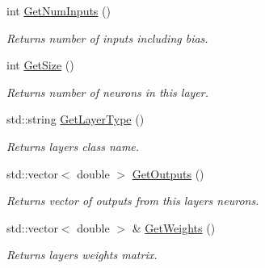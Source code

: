\begin{DoxyCompactItemize}
\item 
\mbox{\label{classneuralnet_1_1Layer_ab3a383cd10179d05d30fa674a334dae3}} 
int \hyperlink{classneuralnet_1_1Layer_ab3a383cd10179d05d30fa674a334dae3}{Get\+Num\+Inputs} ()
\begin{DoxyCompactList}\small\item\em Returns number of inputs including bias. \end{DoxyCompactList}\item 
\mbox{\label{classneuralnet_1_1Layer_a5fbd199b0983a81c21b366abfd59c6f1}} 
int \hyperlink{classneuralnet_1_1Layer_a5fbd199b0983a81c21b366abfd59c6f1}{Get\+Size} ()
\begin{DoxyCompactList}\small\item\em Returns number of neurons in this layer. \end{DoxyCompactList}\item 
\mbox{\label{classneuralnet_1_1Layer_a5485e918776cf9e7c58af494e69ff88f}} 
std\+::string \hyperlink{classneuralnet_1_1Layer_a5485e918776cf9e7c58af494e69ff88f}{Get\+Layer\+Type} ()
\begin{DoxyCompactList}\small\item\em Returns layer\textquotesingle{}s class name. \end{DoxyCompactList}\item 
\mbox{\label{classneuralnet_1_1Layer_add27c4d2f2725b28a37ad9d9bbcc8f39}} 
std\+::vector$<$ double $>$ \hyperlink{classneuralnet_1_1Layer_add27c4d2f2725b28a37ad9d9bbcc8f39}{Get\+Outputs} ()
\begin{DoxyCompactList}\small\item\em Returns vector of outputs from this layer\textquotesingle{}s neurons. \end{DoxyCompactList}\item 
\mbox{\label{classneuralnet_1_1Layer_a08abff765be63911088b4e888793507f}} 
std\+::vector$<$ double $>$ \& \hyperlink{classneuralnet_1_1Layer_a08abff765be63911088b4e888793507f}{Get\+Weights} ()
\begin{DoxyCompactList}\small\item\em Returns layer\textquotesingle{}s weights matrix. \end{DoxyCompactList}\item 

\end{DoxyCompactItemize}
